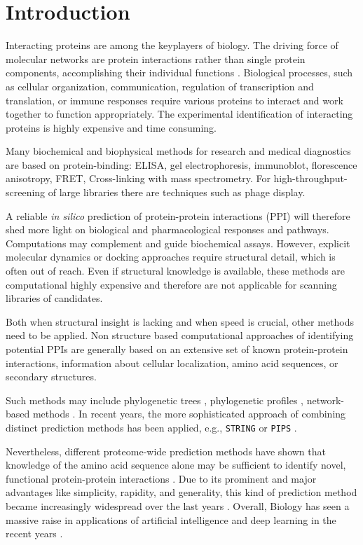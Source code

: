 \documentclass[preprint,3p,times,twocolumn]{elsarticle}
\begin{document}

\section{Introduction}

Interacting proteins are among the keyplayers of biology. The driving
force of molecular networks are protein interactions rather than
single protein components, accomplishing their individual functions
\cite{Pawson:2004}. Biological processes, such as cellular
organization, communication, regulation of transcription and
translation, or immune responses require various proteins to interact
and work together to function appropriately. The experimental
identification of interacting proteins is highly expensive and time
consuming.

Many biochemical and biophysical methods for research and medical diagnostics are based on protein-binding:
ELISA,
gel electrophoresis, immunoblot, florescence anisotropy, FRET,
Cross-linking with mass spectrometry. For high-throughput-screening of
large libraries there are techniques such as phage display. 

A reliable \textit{in silico} prediction of protein-protein
interactions (PPI) will therefore shed more light on biological and
pharmacological responses and pathways. Computations may complement
and guide biochemical assays. However, explicit molecular dynamics or
docking approaches require structural detail, which is often out of
reach. Even if structural knowledge is available, these methods are
computational highly expensive and therefore are not applicable for
scanning libraries of candidates. 

Both when structural insight is lacking and when speed is crucial,
other methods need to be applied. Non structure based computational
approaches of identifying potential PPIs are generally based on an
extensive set of known protein-protein interactions, information about
cellular localization, amino acid sequences, or secondary structures.

Such methods may include phylogenetic trees \cite{Pazos:2001},
phylogenetic profiles \cite{Barker:2005}, network-based methods
\cite{Yook:2004, Clauset:2008}. In recent years, the more
sophisticated approach of combining distinct prediction methods has
been applied, e.g., \texttt{STRING} \cite{Szklarczyk:2011} or
\texttt{PIPS} \cite{McDowall:2009}.

Nevertheless, different proteome-wide prediction methods have shown
that knowledge of the amino acid sequence alone may be sufficient to
identify novel, functional protein-protein interactions
\cite{Martin:2005, Shen:2007}. Due to its prominent and major
advantages like simplicity, rapidity, and generality, this kind of
prediction method became increasingly widespread over the last years
\cite{Ofran:2003, Betel:2007, Liu:2012, Perovic:2017,
  Pan:2010}. Overall, Biology has seen a massive raise in applications
of artificial intelligence and deep learning in the recent years
\cite{Ching:2018}.
\end{document}

